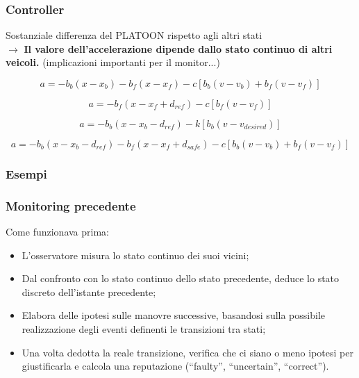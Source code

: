 \documentclass{beamer}
\begin{document}
\begin{frame}
\frametitle{Controller}

Sostanziale differenza del PLATOON rispetto agli altri stati\\
\boldmath $\rightarrow$ \textbf{Il valore dell'accelerazione dipende dallo stato
continuo di altri veicoli.} (implicazioni importanti per il monitor...)\\
\bigskip

\textbf{\color{dred}{Primo caso: veicoli compatibili davanti e dietro}}
$$
a = -b_b (x - x_b) - b_f (x - x_f) - c \left[b_b (v - v_b) + b_f (v - v_f)\right]
$$

\textbf{\color{dred}{Secondo caso: coda del platoon}}
$$
a = -b_{f} (x - x_{f} + d_{ref}) - c \left[b_{f} (v - v_{f})\right]
$$

\textbf{\color{dred}{Terzo caso: leader del platoon, nessuno davanti}}
$$
a = -b_{b} (x - x_{b} - d_{ref}) - k \left[b_{b} (v - v_{desired})\right]
$$

\textbf{\color{dred}{Quarto caso: leader del platoon, veicolo incompatibile davanti}}
$$
a = -b_b (x - x_b - d_{ref}) - b_f (x - x_f + d_{safe}) - c \left[b_b (v - v_b) + b_f (v - v_f)\right]
$$

\end{frame}

\begin{frame}
\frametitle{Esempi}


\end{frame}

\begin{frame}
\frametitle{Monitoring precedente}
Come funzionava prima:
\begin{itemize}
\item L'osservatore misura lo stato continuo dei suoi vicini;
\item Dal confronto con lo stato continuo dello stato precedente, deduce lo stato discreto dell'istante precedente;
\item Elabora delle ipotesi sulle manovre successive, basandosi sulla possibile realizzazione 
degli eventi definenti le transizioni tra stati;
\item Una volta dedotta la reale transizione, verifica che ci siano o meno ipotesi per giustificarla e calcola una reputazione (``faulty'', ``uncertain'', ``correct'').
\end{itemize}
\end{frame}
\end{document}
